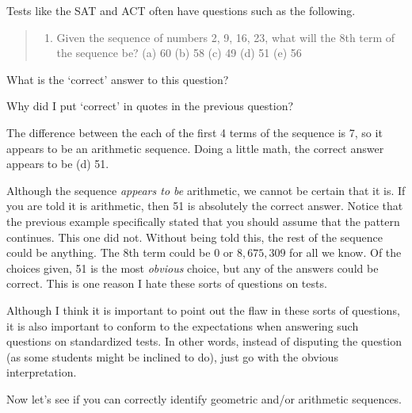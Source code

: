 \begin{ques}
Tests like the SAT and ACT often have questions such as the following.
\begin{quote}
\begin{enumerate}
\item[23.]
Given the sequence of numbers 2, 9, 16, 23, what will the $8$th term of the 
sequence be?
(a) 60 (b) 58 (c) 49 (d) 51 (e) 56
\end{enumerate}
\end{quote}
\begin{lenum}
\item
What is the `correct' answer to this question?

\noindent
\answerlinetwo
\item 
Why did I put `correct' in quotes in the previous question?

\noindent
\answerlinetwo
\end{lenum}
\begin{answer}
\begin{lenum}
\item
The difference between the each of the first 4 terms of the sequence is 7, so it 
appears to be an arithmetic sequence.  Doing a little math, the correct answer
appears to be (d) 51.
\item
Although the sequence {\em appears to be} arithmetic, we cannot be certain that it is. 
If you are told it is arithmetic, then 51 is absolutely the correct answer.
Notice that the previous example specifically stated that you should assume that the
pattern continues.  This one did not.
Without being told this, the rest of the sequence could be anything. 
The $8$th term could be $0$ or $8,675,309$ for all we know.
Of the choices given, 51 is the most {\em obvious} choice, but any of the answers 
could be correct.  This is one reason I hate these sorts of questions on tests.

Although I think it is important to point out the flaw in these sorts of questions,
it is also important to conform to the expectations when answering such questions
on standardized tests.
In other words, instead of disputing the question (as some students might be inclined
to do), just go with the obvious interpretation.
\end{lenum}
\end{answer}
\end{ques}

Now let's see if you can correctly identify geometric and/or arithmetic 
sequences.

